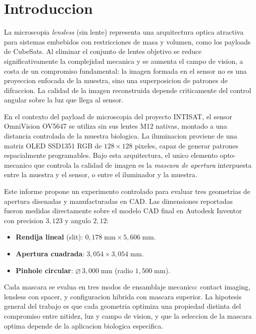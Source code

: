 \documentclass[11pt,a4paper,oneside]{report}
\begin{document}
\tableofcontents
\clearpage

\chapter{Introduccion}

La microscopia \emph{lensless} (sin lente) representa una arquitectura optica
atractiva para sistemas embebidos con restricciones de masa y volumen, como
los payloads de CubeSats. Al eliminar el conjunto de lentes objetivo se reduce
significativamente la complejidad mecanica y se aumenta el campo de vision,
a costa de un compromiso fundamental: la imagen formada en el sensor no es
una proyeccion enfocada de la muestra, sino una superposicion de patrones
de difraccion. La calidad de la imagen reconstruida depende criticamente
del control angular sobre la luz que llega al sensor.

En el contexto del payload de microscopia del proyecto INTISAT, el sensor
OmniVision OV5647 se utiliza sin sus lentes M12 nativas, montado a una
distancia controlada de la muestra biologica. La iluminacion proviene de
una matriz OLED SSD1351 RGB de $128\times 128$ pixeles, capaz de generar
patrones espacialmente programables. Bajo esta arquitectura, el unico
elemento opto-mecanico que controla la calidad de imagen es la \emph{mascara
de apertura} interpuesta entre la muestra y el sensor, o entre el iluminador
y la muestra.

Este informe propone un experimento controlado para evaluar tres geometrias
de apertura disenadas y manufacturadas en CAD. Las dimensiones reportadas
fueron medidas directamente sobre el modelo CAD final en Autodesk Inventor
con precision $3{,}123$ y angulo $2{,}12$:

\begin{medicion}
\begin{itemize}[leftmargin=1.5em]
  \item \textbf{Rendija lineal} (slit): $0{,}178\;\mathrm{mm} \times 5{,}606\;\mathrm{mm}$.
  \item \textbf{Apertura cuadrada}: $3{,}054 \times 3{,}054\;\mathrm{mm}$.
  \item \textbf{Pinhole circular}: $\varnothing\,3{,}000\;\mathrm{mm}$ (radio $1{,}500\;\mathrm{mm}$).
\end{itemize}
\end{medicion}

Cada mascara se evalua en tres modos de ensamblaje mecanico: contact imaging,
lensless con spacer, y configuracion hibrida con mascara superior. La hipotesis
general del trabajo es que cada geometria optimiza una propiedad distinta del
compromiso entre nitidez, luz y campo de vision, y que la seleccion de la
mascara optima depende de la aplicacion biologica especifica.
\end{document}
